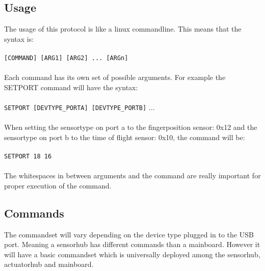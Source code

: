 \subsection{Usage}
The usage of this protocol is like a linux commandline. This means that the syntax is:\\\\
\texttt{[COMMAND] [ARG1] [ARG2] ... [ARGn]}\\\\
Each command has its own set of possible arguments. For example the SETPORT command will have the syntax:\\\\
\texttt{SETPORT [DEVTYPE\_PORTA] [DEVTYPE\_PORTB]} ...\\\\
When setting the sensortype on port a to the fingerposition sensor: 0x12 and the sensortype on port b to the time of flight sensor: 0x10, the command will be:\\\\
\texttt{SETPORT 18 16}\\\\
The whitespaces in between arguments and the command are really important for proper execution of the command.
\subsection{Commands}
The commandset will vary depending on the device type plugged in to the USB port. Meaning a sensorhub has different commands than a mainboard. However it will have a basic commandset which is universally deployed among the sensorhub, actuatorhub and mainboard.

